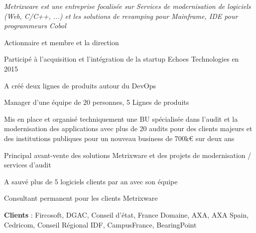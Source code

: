 \begin{cventries}
    {
      \begin{cvitems} %
        \item {\textit{Metrixware est une entreprise focalisée sur Services de modernisation de logiciels (Web, C/C++, ...) et les solutions de revamping pour Mainframe, IDE pour programmeurs Cobol}}
        \item {Actionnaire et membre et la direction}
        \item {Participé à l'acquisition et l'intégration de la startup Echoes Technologies en 2015}
        \item {A créé deux lignes de produits autour du DevOps}
        \item {Manager d'une équipe de 20 personnes, 5 Lignes de produits}
        \item {Mis en place et organisé techniquement une BU spécialisée dans l'audit et la modernisation des applications avec plus de 20 audits pour des clients majeurs et des institutions publiques pour un nouveau business de 700k€ sur deux ans}
        \item {Principal avant-vente des solutions Metrixware et des projets de modernisation / services d'audit}
        \item {A sauvé plus de 5 logiciels clients par an avec son équipe}
        \item {Consultant permanent pour les clients Metrixware}
        \item {\textbf{Clients} : Fircosoft, DGAC, Conseil d'état, France Domaine, AXA, AXA Spain, Cedricom, Conseil Régional IDF, CampusFrance, BearingPoint}
      \end{cvitems}
    }


\end{cventries}

